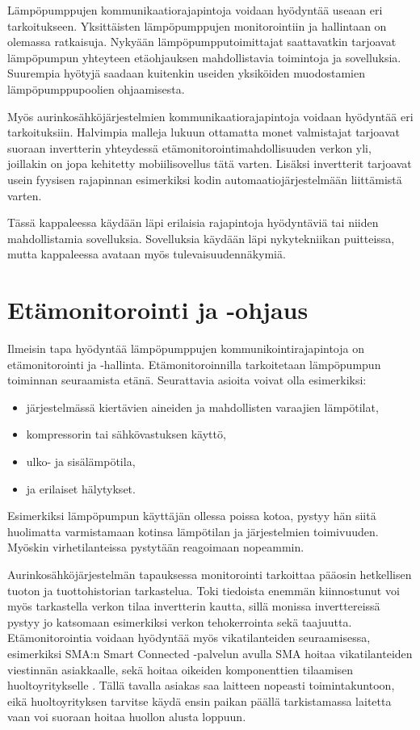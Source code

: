 Lämpöpumppujen kommunikaatiorajapintoja voidaan hyödyntää useaan eri tarkoitukseen. Yksittäisten lämpöpumppujen monitorointiin ja hallintaan on olemassa ratkaisuja. Nykyään lämpöpumpputoimittajat saattavatkin tarjoavat lämpöpumpun yhteyteen etäohjauksen mahdollistavia toimintoja ja sovelluksia. Suurempia hyötyjä saadaan kuitenkin useiden yksiköiden muodostamien lämpöpumppupoolien ohjaamisesta.

Myös aurinkosähköjärjestelmien kommunikaatiorajapintoja voidaan hyödyntää eri tarkoituksiin. Halvimpia malleja lukuun ottamatta monet valmistajat tarjoavat suoraan invertterin yhteydessä etämonitorointimahdollisuuden verkon yli, joillakin on jopa kehitetty mobiilisovellus tätä varten. Lisäksi invertterit tarjoavat usein fyysisen rajapinnan esimerkiksi kodin automaatiojärjestelmään liittämistä varten.

Tässä kappaleessa käydään läpi erilaisia rajapintoja hyödyntäviä tai niiden mahdollistamia sovelluksia. Sovelluksia käydään läpi nykytekniikan puitteissa, mutta kappaleessa avataan myös tulevaisuudennäkymiä.


\section{Etämonitorointi ja -ohjaus}

  Ilmeisin tapa hyödyntää lämpöpumppujen kommunikointirajapintoja on etämonitorointi ja -hallinta. Etämonitoroinnilla tarkoitetaan lämpöpumpun toiminnan seuraamista etänä. Seurattavia asioita voivat olla esimerkiksi:
  \begin{itemize}
    \item järjestelmässä kiertävien aineiden ja mahdollisten varaajien lämpötilat,
    \item kompressorin tai sähkövastuksen käyttö,
    \item ulko- ja sisälämpötila,
    \item ja erilaiset hälytykset.
  \end{itemize} \parencite{Latomaki}
  Esimerkiksi lämpöpumpun käyttäjän ollessa poissa kotoa, pystyy hän siitä huolimatta varmistamaan kotinsa lämpötilan ja järjestelmien toimivuuden. Myöskin virhetilanteissa pystytään reagoimaan nopeammin.

  Aurinkosähköjärjestelmän tapauksessa monitorointi tarkoittaa pääosin hetkellisen tuoton ja tuottohistorian tarkastelua. Toki tiedoista enemmän kiinnostunut voi myös tarkastella verkon tilaa invertterin kautta, sillä monissa inverttereissä pystyy jo katsomaan esimerkiksi verkon tehokerrointa sekä taajuutta. Etämonitorointia voidaan hyödyntää myös vikatilanteiden seuraamisessa, esimerkiksi SMA:n Smart Connected -palvelun avulla SMA hoitaa vikatilanteiden viestinnän asiakkaalle, sekä hoitaa oikeiden komponenttien tilaamisen huoltoyritykselle \parencite{SmartConnected}. Tällä tavalla asiakas saa laitteen nopeasti toimintakuntoon, eikä huoltoyrityksen tarvitse käydä ensin paikan päällä tarkistamassa laitetta vaan voi suoraan hoitaa huollon alusta loppuun.

